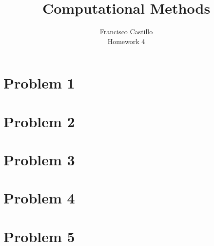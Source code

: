 \documentclass[12pt]{article}
\begin{document}
 
 
 
\title{Computational Methods}%
\author{Francisco Castillo\\Homework 4} %
 
\maketitle
\section*{Problem 1}

\newpage
\section*{Problem 2}

\newpage
\section*{Problem 3}

\newpage
\section*{Problem 4}

\newpage
\section*{Problem 5}



\end{document}
